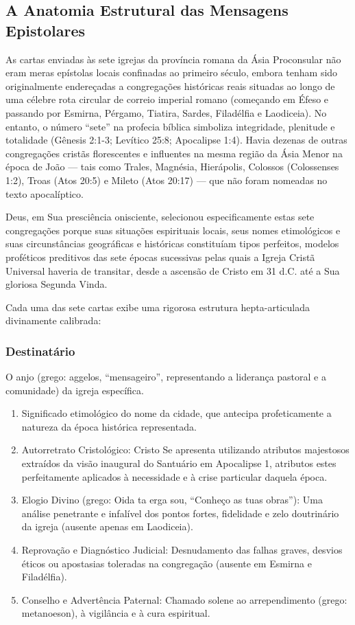 \documentclass[11pt,a4paper,openany]{book}
\begin{document}
\subsection{A Anatomia Estrutural das Mensagens Epistolares}


As cartas enviadas às sete igrejas da província romana da Ásia Proconsular não eram meras epístolas locais confinadas ao primeiro século, embora tenham sido originalmente endereçadas a congregações históricas reais situadas ao longo de uma célebre rota circular de correio imperial romano (começando em Éfeso e passando por Esmirna, Pérgamo, Tiatira, Sardes, Filadélfia e Laodiceia). No entanto, o número ``sete'' na profecia bíblica simboliza integridade, plenitude e totalidade (Gênesis 2:1-3; Levítico 25:8; Apocalipse 1:4). Havia dezenas de outras congregações cristãs florescentes e influentes na mesma região da Ásia Menor na época de João — tais como Trales, Magnésia, Hierápolis, Colossos (Colossenses 1:2), Troas (Atos 20:5) e Mileto (Atos 20:17) — que não foram nomeadas no texto apocalíptico.

Deus, em Sua presciência onisciente, selecionou especificamente estas sete congregações porque suas situações espirituais locais, seus nomes etimológicos e suas circunstâncias geográficas e históricas constituíam tipos perfeitos, modelos proféticos preditivos das sete épocas sucessivas pelas quais a Igreja Cristã Universal haveria de transitar, desde a ascensão de Cristo em 31 d.C. até a Sua gloriosa Segunda Vinda.

Cada uma das sete cartas exibe uma rigorosa estrutura hepta-articulada divinamente calibrada:

\subsubsection*{Destinatário}
O anjo (grego: aggelos, ``mensageiro'', representando a liderança pastoral e a comunidade) da igreja específica.
\begin{enumerate}
  \item Significado etimológico do nome da cidade, que antecipa profeticamente a natureza da época histórica representada.
  \item Autorretrato Cristológico: Cristo Se apresenta utilizando atributos majestosos extraídos da visão inaugural do Santuário em Apocalipse 1, atributos estes perfeitamente aplicados à necessidade e à crise particular daquela época.
  \item Elogio Divino (grego: Oida ta erga sou, ``Conheço as tuas obras''): Uma análise penetrante e infalível dos pontos fortes, fidelidade e zelo doutrinário da igreja (ausente apenas em Laodiceia).
  \item Reprovação e Diagnóstico Judicial: Desnudamento das falhas graves, desvios éticos ou apostasias toleradas na congregação (ausente em Esmirna e Filadélfia).
  \item Conselho e Advertência Paternal: Chamado solene ao arrependimento (grego: metanoeson), à vigilância e à cura espiritual.
\end{enumerate}
\end{document}
